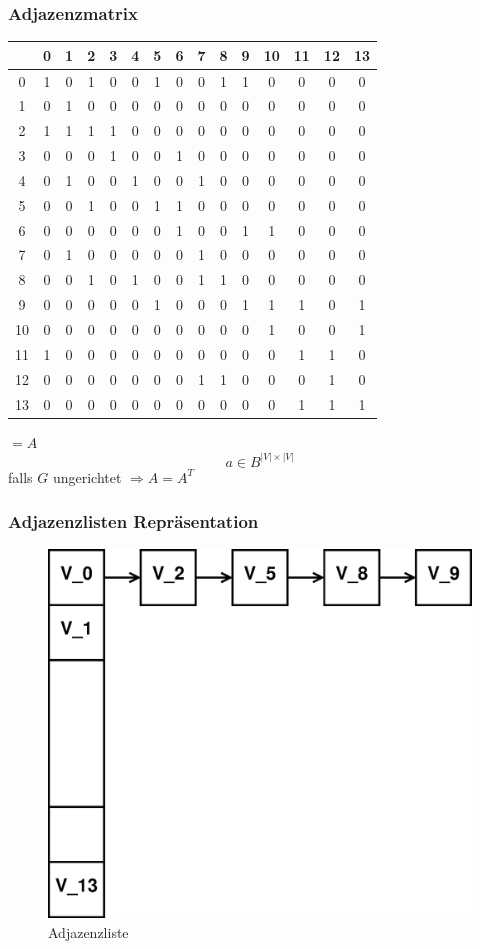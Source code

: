 \subsubsection{Adjazenzmatrix}
\begin{tabular}{|c|cccccccccccccc|}
	\hline
	  &0&1&2&3&4&5&6&7&8&9&10&11&12&13 \\ \hline
	 0&1&0&1&0&0&1&0&0&1&1& 0& 0& 0& 0 \\
	 1&0&1&0&0&0&0&0&0&0&0& 0& 0& 0& 0 \\
	 2&1&1&1&1&0&0&0&0&0&0& 0& 0& 0& 0 \\
	 3&0&0&0&1&0&0&1&0&0&0& 0& 0& 0& 0 \\ \hline
	 4&0&1&0&0&1&0&0&1&0&0& 0& 0& 0& 0 \\ 
	 5&0&0&1&0&0&1&1&0&0&0& 0& 0& 0& 0 \\
	 6&0&0&0&0&0&0&1&0&0&1& 1& 0& 0& 0 \\
	 7&0&1&0&0&0&0&0&1&0&0& 0& 0& 0& 0 \\ \hline
	 8&0&0&1&0&1&0&0&1&1&0& 0& 0& 0& 0 \\
	 9&0&0&0&0&0&1&0&0&0&1& 1& 1& 0& 1 \\
	10&0&0&0&0&0&0&0&0&0&0& 1& 0& 0& 1 \\
	11&1&0&0&0&0&0&0&0&0&0& 0& 1& 1& 0 \\ \hline
	12&0&0&0&0&0&0&0&1&1&0& 0& 0& 1& 0 \\
	13&0&0&0&0&0&0&0&0&0&0& 0& 1& 1& 1 \\ \hline
	
\end{tabular}$= A$
\[ a\in B^{|V|\times |V|} \]
falls $G$ ungerichtet $\Rightarrow A = A^T$
\subsubsection{Adjazenzlisten Repräsentation}
\begin{figure}[H]
\centering
\includegraphics[width=0.4\linewidth]{15/Grafik/Liste}
\caption{Adjazenzliste}
\label{fig:Liste}
\end{figure}


